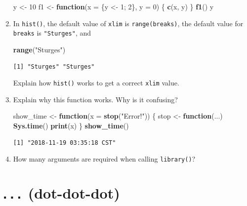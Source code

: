 \documentclass[]{book}
\newenvironment{Shaded}{\begin{snugshade}}{\end{snugshade}}
\newcommand{\ControlFlowTok}[1]{\textcolor[rgb]{0.13,0.29,0.53}{\textbf{#1}}}
\newcommand{\DataTypeTok}[1]{\textcolor[rgb]{0.13,0.29,0.53}{#1}}
\newcommand{\DecValTok}[1]{\textcolor[rgb]{0.00,0.00,0.81}{#1}}
\newcommand{\KeywordTok}[1]{\textcolor[rgb]{0.13,0.29,0.53}{\textbf{#1}}}
\newcommand{\NormalTok}[1]{#1}
\newcommand{\StringTok}[1]{\textcolor[rgb]{0.31,0.60,0.02}{#1}}
\theoremstyle{definition}
\theoremstyle{definition}
\theoremstyle{definition}
\theoremstyle{remark}
\begin{document}
\begin{enumerate}
\begin{Shaded}
\begin{Highlighting}[]
\NormalTok{y <-}\StringTok{ }\DecValTok{10}
\NormalTok{f1 <-}\StringTok{ }\ControlFlowTok{function}\NormalTok{(}\DataTypeTok{x =}\NormalTok{ \{y <-}\StringTok{ }\DecValTok{1}\NormalTok{; }\DecValTok{2}\NormalTok{\}, }\DataTypeTok{y =} \DecValTok{0}\NormalTok{) \{}
  \KeywordTok{c}\NormalTok{(x, y)}
\NormalTok{\}}
\KeywordTok{f1}\NormalTok{()}
\NormalTok{y}
\end{Highlighting}
\end{Shaded}
\item
  In \texttt{hist()}, the default value of \texttt{xlim} is
  \texttt{range(breaks)}, the default value for \texttt{breaks} is
  \texttt{"Sturges"}, and

\begin{Shaded}
\begin{Highlighting}[]
\KeywordTok{range}\NormalTok{(}\StringTok{"Sturges"}\NormalTok{)}
\end{Highlighting}
\end{Shaded}

\begin{verbatim}
[1] "Sturges" "Sturges"
\end{verbatim}

  Explain how \texttt{hist()} works to get a correct \texttt{xlim}
  value.
\item
  Explain why this function works. Why is it confusing?

\begin{Shaded}
\begin{Highlighting}[]
\NormalTok{show_time <-}\StringTok{ }\ControlFlowTok{function}\NormalTok{(}\DataTypeTok{x =} \KeywordTok{stop}\NormalTok{(}\StringTok{"Error!"}\NormalTok{)) \{}
\NormalTok{  stop <-}\StringTok{ }\ControlFlowTok{function}\NormalTok{(...) }\KeywordTok{Sys.time}\NormalTok{()}
  \KeywordTok{print}\NormalTok{(x)}
\NormalTok{\}}
\KeywordTok{show_time}\NormalTok{()}
\end{Highlighting}
\end{Shaded}

\begin{verbatim}
[1] "2018-11-19 03:35:18 CST"
\end{verbatim}
\item
  How many arguments are required when calling \texttt{library()}?
\end{enumerate}

\hypertarget{fun-dot-dot-dot}{%
\section{\texorpdfstring{\texttt{...}
(dot-dot-dot)}{... (dot-dot-dot)}}\label{fun-dot-dot-dot}}
\end{document}
